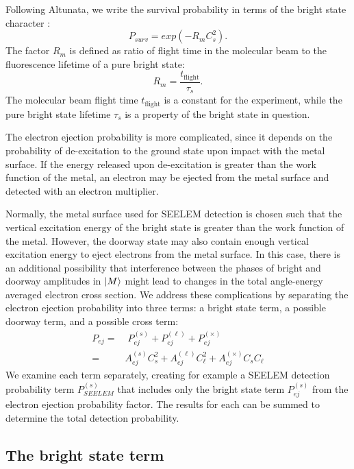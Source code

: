 Following Altunata, we write the survival probability
in terms of the bright state character \cite{altunata00}:
\begin{equation}
  P_{surv} = exp \left( -R_m C_s^2 \right).
\end{equation}
The factor $R_m$ is defined as ratio of flight time in the molecular
beam to the fluorescence lifetime of a pure bright state:
\begin{equation}
  R_m = \frac{t_{\text{flight}}}{\tau_s}.
\end{equation}
The molecular beam flight time $t_{\text{flight}}$ is a constant for
the experiment, while the pure bright state lifetime $\tau_s$ is a
property of the bright state in question.

The electron ejection probability is more complicated, since it
depends on the probability of de-excitation to the ground state upon
impact with the metal surface.  If the energy released upon
de-excitation is greater than the work function of the metal, an
electron may be ejected from the metal surface and detected with an
electron multiplier.

Normally, the metal surface used for SEELEM detection is chosen such
that the vertical excitation energy of the bright state is greater
than the work function of the metal. However, the doorway state may
also contain enough vertical excitation energy to eject electrons from
the metal surface. In this case, there is an additional possibility
that interference between the phases of bright and doorway amplitudes
in $\mathinner{|{M}\rangle}$ might lead to changes in the total angle-energy averaged
electron cross section. We address these complications by separating
the electron ejection probability into three terms: a bright state
term, a possible doorway term, and a possible cross term:
\begin{equation}
  \begin{split}
    P_{ej} =& \; P_{ej}^{(s)} + P_{ej}^{(\ell)} + P_{ej}^{(\times)}\\ 
    =& A_{ej}^{(s)} C_s^2 + A_{ej}^{(\ell)} C_\ell^2 + A_{ej}^{(\times)} C_s C_\ell
  \end{split}
\end{equation}
We examine each term separately, creating for example a SEELEM
detection probability term $P_{SEELEM}^{(s)}$ that includes only the
bright state term $P_{ej}^{(s)}$ from the electron ejection
probability factor.  The results for each can be summed to determine
the total detection probability.

\subsection{The bright state term}
\label{sec:bright-state-term}

